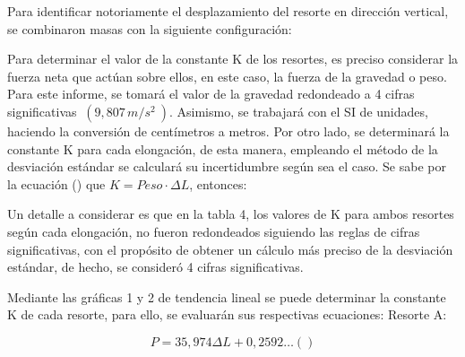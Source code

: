 \documentclass[../main.tex]{subfiles}
\begin{document}

Para identificar notoriamente el desplazamiento del resorte en dirección vertical, se combinaron masas con la siguiente configuración:


Para determinar el valor de la constante K de los resortes, es preciso considerar la
fuerza neta que actúan sobre ellos, en este caso, la fuerza de la gravedad o peso.
Para este informe, se tomará el valor de la gravedad redondeado a 4 cifras 
significativas $\ (9,807 \, m/s^2\ )$. Asimismo, se trabajará con el SI
de unidades, haciendo la conversión de centímetros a metros. Por otro lado, se determinará 
la constante K para cada elongación, de esta manera, empleando el método de la 
desviación estándar se calculará su incertidumbre según sea el caso.
Se sabe por la ecuación () que $ K = Peso \cdot \Delta L$, entonces:


Un detalle a considerar es que en la tabla 4, los valores de K para ambos resortes 
según cada elongación, no fueron redondeados siguiendo las reglas de cifras significativas, con el propósito de obtener un cálculo más preciso de la desviación estándar, de hecho, se consideró 4 cifras significativas.


Mediante las gráficas 1 y 2 de tendencia lineal se puede determinar la
constante K de cada resorte, para ello, se evaluarán sus respectivas ecuaciones:
Resorte A:

\[P=35,974 \Delta  L +0,2592…()\]
\end{document}
